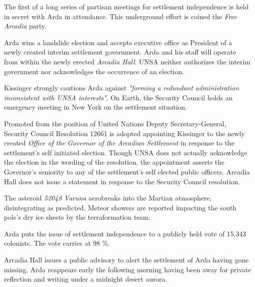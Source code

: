 

The first of a long series of partisan meetings for settlement independence is held in secret with Arda in attendance. This underground effort is coined the {\it Free Arcadia} party.
\StopTimelineDate

Arda wins a landslide election and accepts executive office as President of a newly created interim settlement government. Arda and his staff will operate from within the newly erected {\it Arcadia Hall}. UNSA neither authorizes the interim government nor acknowledges the occurrence of an election.

Kissinger strongly cautions Arda against {\it "forming a redundant administration inconsistent with UNSA interests"}. On Earth, the Security Council holds an emergency meeting in New York on the settlement situation.
\StopTimelineDate

Promoted from the position of United Nations Deputy Secretary-General, Security Council Resolution 12661 is adopted appointing Kissinger to the newly created {\it Office of the Governor of the Arcadian Settlement} in response to the settlement's self initiated election. Though UNSA does not actually acknowledge the election in the wording of the resolution, the appointment asserts the Governor's seniority to any of the settlement's self elected public officers. Arcadia Hall does not issue a statement in response to the Security Council resolution.
\StopTimelineDate

The asteroid {\it 52048 Varuna} aerobreaks into the Martian atmosphere, disintegrating as predicted. Meteor showers are reported impacting the south pole's dry ice sheets by the terraformation team.
\StopTimelineDate

Arda puts the issue of settlement independence to a publicly held vote of 15,343 colonists. The vote carries at 98 \%.
\StopTimelineDate

Arcadia Hall issues a public advisory to alert the settlement of Arda having gone missing. Arda reappears early the following morning having been away for private reflection and writing under a midnight desert aurora.
\StopTimelineDate

